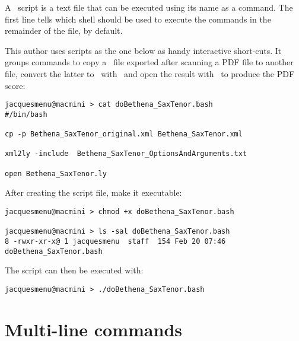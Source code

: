 A \shell\ script is a text file that can be executed using its name as a command. The first line tells which shell should be used to execute the commands in the remainder of the file,  by default.

This author uses scripts as the one below as handy interactive short-cuts. It groups commands to copy a \mxml\ file exported after scanning a PDF file to another file, convert the latter to \lily\ with \xmlToLy\ and open the result with \fresco\ to produce the PDF score:
\begin{lstlisting}[language=Terminal]
jacquesmenu@macmini > cat doBethena_SaxTenor.bash 
#/bin/bash

cp -p Bethena_SaxTenor_original.xml Bethena_SaxTenor.xml

xml2ly -include  Bethena_SaxTenor_OptionsAndArguments.txt

open Bethena_SaxTenor.ly
\end{lstlisting}

After creating the script file, make it executable:
\begin{lstlisting}[language=Terminal]
jacquesmenu@macmini > chmod +x doBethena_SaxTenor.bash

jacquesmenu@macmini > ls -sal doBethena_SaxTenor.bash 
8 -rwxr-xr-x@ 1 jacquesmenu  staff  154 Feb 20 07:46 doBethena_SaxTenor.bash
\end{lstlisting}

The script can then be executed with:
\begin{lstlisting}[language=Terminal]
jacquesmenu@macmini > ./doBethena_SaxTenor.bash 
\end{lstlisting}


\section{Multi-line commands}\label{Multi-line commands}


